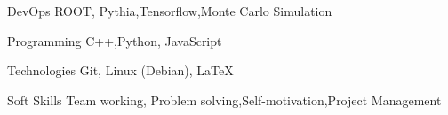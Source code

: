 

\begin{cvskills}

  \cvskill
    {DevOps} %
    {ROOT, Pythia,Tensorflow,Monte Carlo Simulation} %


  \cvskill
    {Programming} %
    {  C++,Python, JavaScript} %

  \cvskill
    {Technologies} %
    { Git,  Linux (Debian), \LaTeX} %

      \cvskill
    {Soft Skills} %
    {Team working, Problem solving,Self-motivation,Project Management} %


\end{cvskills}
